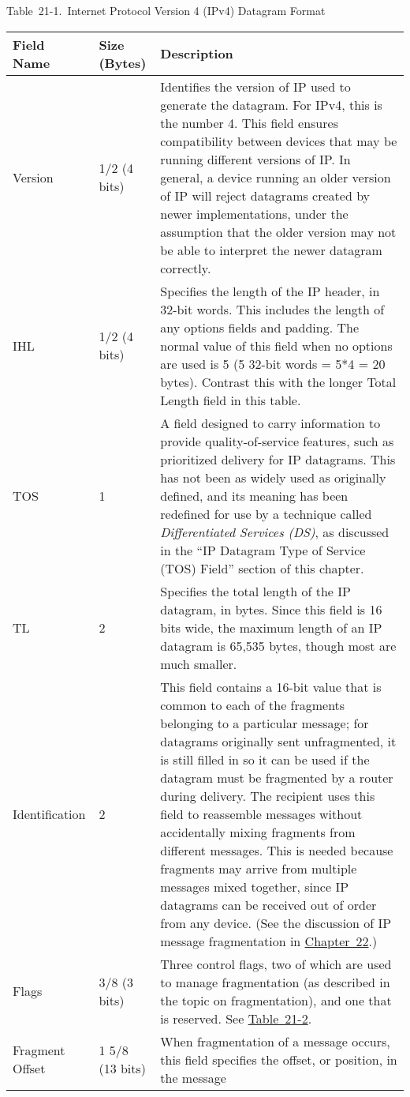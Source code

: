 Table~21-1.~Internet Protocol Version 4 (IPv4) Datagram Format

\begin{longtable}[]{@{}lll@{}}
\toprule
Field Name & Size (Bytes) & Description\tabularnewline
\midrule
\endhead
Version & 1/2 (4 bits) & Identifies the version of IP used to generate
the datagram. For IPv4, this is the number 4. This field ensures
compatibility between devices that may be running different versions of
IP. In general, a device running an older version of IP will reject
datagrams created by newer implementations, under the assumption that
the older version may not be able to interpret the newer datagram
correctly.\tabularnewline
IHL & 1/2 (4 bits) & Specifies the length of the IP header, in 32-bit
words. This includes the length of any options fields and padding. The
normal value of this field when no options are used is 5 (5 32-bit words
= 5*4 = 20 bytes). Contrast this with the longer Total Length field in
this table.\tabularnewline
TOS & 1 & A field designed to carry information to provide
quality-of-service features, such as prioritized delivery for IP
datagrams. This has not been as widely used as originally defined, and
its meaning has been redefined for use by a technique called
{\emph{Differentiated Services (DS)}}, as discussed in the ``IP Datagram
Type of Service (TOS) Field'' section of this chapter.\tabularnewline
TL & 2 & Specifies the total length of the IP datagram, in bytes. Since
this field is 16 bits wide, the maximum length of an IP datagram is
65,535 bytes, though most are much smaller.\tabularnewline
Identification & 2 & This field contains a 16-bit value that is common
to each of the fragments belonging to a particular message; for
datagrams originally sent unfragmented, it is still filled in so it can
be used if the datagram must be fragmented by a router during delivery.
The recipient uses this field to reassemble messages without
accidentally mixing fragments from different messages. This is needed
because fragments may arrive from multiple messages mixed together,
since IP datagrams can be received out of order from any device. (See
the discussion of IP message fragmentation in
\protect\hyperlink{ch22.html}{Chapter~22}.)\tabularnewline
Flags & 3/8 (3 bits) & Three control flags, two of which are used to
manage fragmentation (as described in the topic on fragmentation), and
one that is reserved. See
\protect\hyperlink{ch21s02.htmlux5cux23ipv_flags_subfields}{Table~21-2}.\tabularnewline
Fragment Offset & 1 5/8 (13 bits) & When fragmentation of a message
occurs, this field specifies the offset, or position, in the message

\end{longtable}
